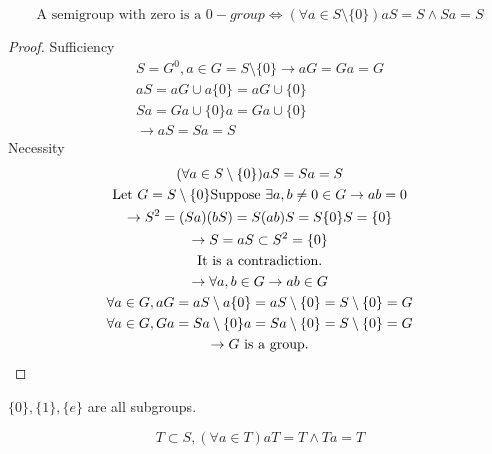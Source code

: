 \begin{Prop}
    \[
        \text{A semigroup with zero is a }0-group \Leftrightarrow (\forall a \in S \setminus \{0\})aS=S\wedge Sa=S
    \]
    \begin{proof}
        Sufficiency
        \begin{gather*}
        S=G^0,a \in G=S \setminus \{0\} \rightarrow aG=Ga=G \\
        aS=aG \cup a\{0\}=aG \cup \{0\} \\
        Sa=Ga \cup \{0\} a=Ga \cup \{0\}    \\
        \rightarrow aS = Sa = S
        \end{gather*}
        Necessity
        \begin{gather*}
            (\forall a \in S \setminus \{0\})aS=Sa=S    \\
            \text{Let }G=S \setminus \{0\}
            \text{Suppose }\exists a,b \neq 0 \in G \rightarrow ab=0   \\
            \rightarrow S^2=(Sa)(bS)=S(ab)S=S\{0\}S=\{0\}   \\
            \rightarrow S=aS \subset S^2 =\{0\} \\
            \text{It is a contradiction.}   \\
            \rightarrow \forall a,b \in G \rightarrow ab \in G  \\
            \forall a \in G, aG=aS \setminus a\{0\}=aS \setminus \{0\}=S \setminus \{0\}=G  \\
            \forall a \in G,Ga=Sa \setminus \{0\}a=Sa \setminus \{0\}=S \setminus \{0\}=G   \\
            \rightarrow G  \text{\space is a group.}
        \end{gather*}
    \end{proof}
\end{Prop}



\begin{Exap}[Subgroups]
    $\{0\},\{1\},\{e\}$ \space are all subgroups.   
\end{Exap}

\begin{Rmk}
    \[
        T \subset S,(\forall a \in T) aT=T \wedge Ta=T
    \]
\end{Rmk}

